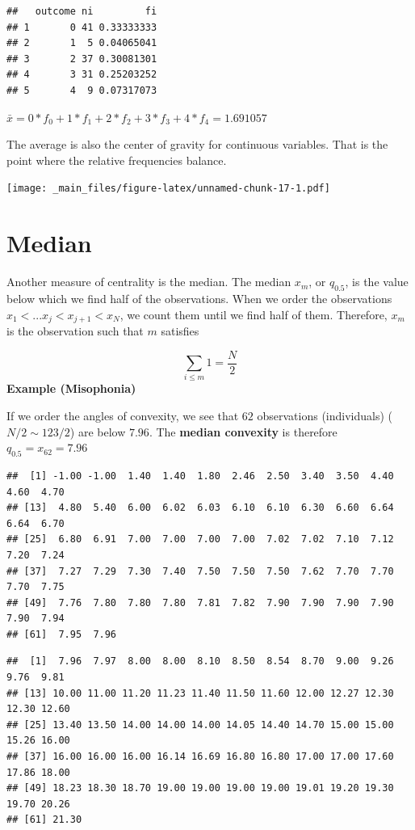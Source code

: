 \documentclass[
]{book}
\begin{document}
\begin{verbatim}
##   outcome ni         fi
## 1       0 41 0.33333333
## 2       1  5 0.04065041
## 3       2 37 0.30081301
## 4       3 31 0.25203252
## 5       4  9 0.07317073
\end{verbatim}

\(\bar{x}=0*f_ {0}+ 1*f_{1}+2*f_{2}+3*f_{3}+4*f_{4}=1.691057\)

The average is also the center of gravity for continuous variables. That is the point where the relative frequencies balance.

\texttt{[image: \_main\_files/figure-latex/unnamed-chunk-17-1.pdf]}

\hypertarget{median}{%
\section{Median}\label{median}}

Another measure of centrality is the median. The median \(x_m\), or \(q_{0.5}\), is the value below which we find half of the observations. When we order the observations \(x_1 <... x_j < x_{j+1} < x_N\), we count them until we find half of them. Therefore, \(x_m\) is the observation such that \(m\) satisfies

\[\sum_{i\leq m} 1 = \frac{N}{2}\]
\textbf{Example (Misophonia)}

If we order the angles of convexity, we see that \(62\) observations (individuals) (\(N/2 \sim 123/2\)) are below \(7.96\). The \textbf{median convexity} is therefore \(q_{0.5}= x_{62}=7.96\)

\begin{verbatim}
##  [1] -1.00 -1.00  1.40  1.40  1.80  2.46  2.50  3.40  3.50  4.40  4.60  4.70
## [13]  4.80  5.40  6.00  6.02  6.03  6.10  6.10  6.30  6.60  6.64  6.64  6.70
## [25]  6.80  6.91  7.00  7.00  7.00  7.00  7.02  7.02  7.10  7.12  7.20  7.24
## [37]  7.27  7.29  7.30  7.40  7.50  7.50  7.50  7.62  7.70  7.70  7.70  7.75
## [49]  7.76  7.80  7.80  7.80  7.81  7.82  7.90  7.90  7.90  7.90  7.90  7.94
## [61]  7.95  7.96
\end{verbatim}

\begin{verbatim}
##  [1]  7.96  7.97  8.00  8.00  8.10  8.50  8.54  8.70  9.00  9.26  9.76  9.81
## [13] 10.00 11.00 11.20 11.23 11.40 11.50 11.60 12.00 12.27 12.30 12.30 12.60
## [25] 13.40 13.50 14.00 14.00 14.00 14.05 14.40 14.70 15.00 15.00 15.26 16.00
## [37] 16.00 16.00 16.00 16.14 16.69 16.80 16.80 17.00 17.00 17.60 17.86 18.00
## [49] 18.23 18.30 18.70 19.00 19.00 19.00 19.00 19.01 19.20 19.30 19.70 20.26
## [61] 21.30
\end{verbatim}
\end{document}
